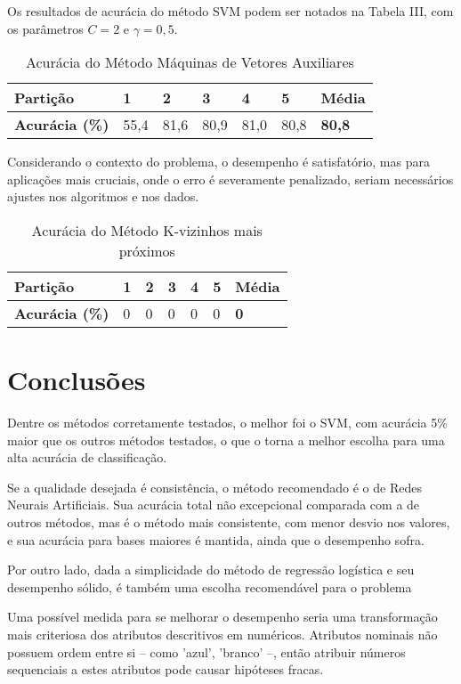 \documentclass[10pt, conference, compsocconf]{IEEEtran}
\begin{document}
Os resultados de acurácia do método SVM podem ser notados na Tabela III, com os parâmetros $C = 2$ e $\gamma = 0,5$.

\begin{table}[t]
\centering
\caption{Acurácia do Método Máquinas de Vetores Auxiliares}
\label{svm}
\begin{tabular}{l|l|l|l|l|l|l}
\hline\hline
\textbf{Partição} & 1    & 2    & 3    & 4    & 5    & \textbf{Média} \\ \hline
\textbf{Acurácia (\%)} & 55,4 & 81,6 & 80,9 & 81,0 & 80,8 & \textbf{80,8}  \\ \hline
\hline
\end{tabular}
\end{table}

Considerando o contexto do problema, o desempenho é satisfatório, mas para aplicações mais cruciais, onde o erro é severamente penalizado, seriam necessários ajustes nos algoritmos e nos dados.

\begin{table}[t]
\centering
\caption{Acurácia do Método K-vizinhos mais próximos}
\label{knn}
\begin{tabular}{l|l|l|l|l|l|l}
\hline\hline
\textbf{Partição} & 1    & 2    & 3    & 4    & 5    & \textbf{Média} \\ \hline
\textbf{Acurácia (\%)} & 0 & 0 & 0 & 0 & 0 & \textbf{0}  \\ \hline
\hline
\end{tabular}
\end{table}

\section{Conclusões}

Dentre os métodos corretamente testados, o melhor foi o SVM, com acurácia 5\% maior que os outros métodos testados, o que o torna a melhor escolha para uma alta acurácia de classificação. 

Se a qualidade desejada é consistência, o método recomendado é o de Redes Neurais Artificiais. Sua acurácia total não excepcional comparada com a de outros métodos, mas é o método mais consistente, com menor desvio nos valores, e sua acurácia para bases maiores é mantida, ainda que o desempenho sofra.

Por outro lado, dada a simplicidade do método de regressão logística e seu desempenho sólido, é também uma escolha recomendável para o problema

Uma possível medida para se melhorar o desempenho seria uma transformação mais criteriosa dos atributos descritivos em numéricos. Atributos nominais não possuem ordem entre si -- como 'azul', 'branco' --, então atribuir números sequenciais a estes atributos pode causar hipóteses fracas.
\end{document}
